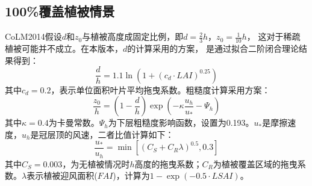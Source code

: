 \subsection{100\%覆盖植被情景}
CoLM2014假设$d$和$z_0$与植被高度成固定比例，即$d=\frac{2}{3}h$，$z_0=\frac{1}{10}h$，
这对于稀疏植被可能并不成立\citep{zeng2007consistent}。在本版本，$d$的计算采用\citet{choudhury1988}的方案，
是通过拟合\citet{shaw1982aerodynamic}二阶闭合理论结果得到：
\begin{equation}\label{dOh}
\frac{d}{h}=1.1 \ln \left(1+\left(c_{d} \cdot LAI \right)^{0.25}\right)
\end{equation}
其中$c_d=0.2$，表示单位面积叶片平均拖曳系数。粗糙度计算采用\citet{raupach1992drag,raupach1994simplified}方案：
\begin{equation}\label{zOh}
\frac{z_{0}}{h}=\left(1-\frac{d}{h}\right) \exp \left(-\kappa \frac{u_{h}}{u_{*}}-\Psi_{h}\right)
\end{equation}
其中$\kappa=0.4$为卡曼常数。$\Psi_h$为下层粗糙度影响函数，设置为0.193。$u_\ast$是摩擦速度，$u_h$是冠层顶的风速，二者比值计算如下：
\begin{equation}\label{ustrarOuh}
\frac{u_{*}}{u_{h}}=\min \left[\left(C_{S}+C_{R} \lambda\right)^{0.5}, 0.3\right]
\end{equation}
其中$C_S=0.003$，为无植被情况时$h$高度的拖曳系数；$C_R$为植被覆盖区域的拖曳系数。$\lambda$表示植被迎风面积($FAI$)，计算为$1-\exp{\left(-0.5 \cdot LSAI\right)}$。


